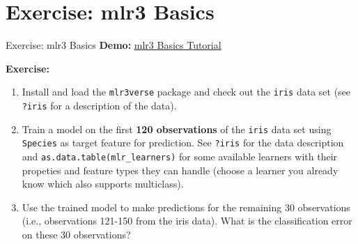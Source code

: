\documentclass[11pt,compress]{beamer}
\begin{document}
\section{Exercise: mlr3 Basics} %
\begin{frame}{Exercise: mlr3 Basics}
\textbf{Demo:} \href{https://mlr3gallery.mlr-org.com/posts/2020-03-11-basics-german-credit/}{\underline{mlr3 Basics Tutorial}}

\textbf{Exercise:}
\begin{enumerate}
\item Install and load the \texttt{mlr3verse} package and check out the \texttt{iris} data set (see \texttt{?iris} for a description of the data).
\item Train a model on the first \textbf{120 observations} of the \texttt{iris} data set using \texttt{Species} as target feature for prediction. See \texttt{?iris} for the data description and \texttt{as.data.table(mlr\_learners)} for some available learners with their propeties and feature types they can handle (choose a learner you already know which also supports multiclass).
\item Use the trained model to make predictions for the remaining 30 observations (i.e., observations 121-150 from the iris data). What is the classification error on these 30 observations?
\end{enumerate}
\end{frame}
\end{document}

